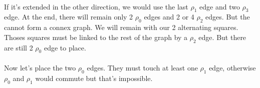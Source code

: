 \paragraph{}
If it's extended in the other direction, we would use the last $\rho_1$ edge and two $\rho_3$ edge. At the end, there will remain only 2 $\rho_0$ edges and 2 or 4 $\rho_2$ edges. But the cannot form a connex graph. We will remain with our 2 alternating squares. Thoses squares must be linked to the rest of the graph by a $\rho_2$ edge. But there are still 2 $\rho_0$ edge to place.

\begin{figure}[H]
  \begin{center}
    \caption{}
  \end{center}
\end{figure}


\paragraph{}
Now let's place the two $\rho_0$ edges. They must touch at least one $\rho_1$ edge, otherwise $\rho_0$ and $\rho_1$ would commute but that's impossible.

